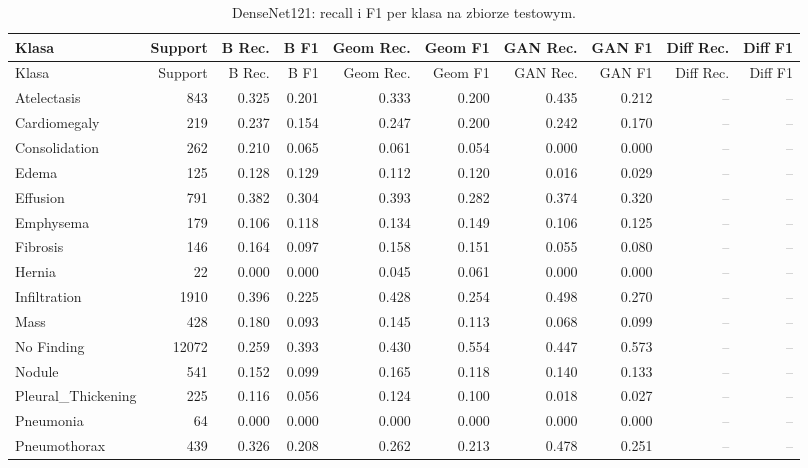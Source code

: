 \documentclass[11pt,a4paper]{article}
\newcommand{\missingresult}{\textcolor{gray}{--}}
\begin{document}
\scriptsize
\begin{longtable}{lrrrrrrrrr}
\caption{DenseNet121: recall i F1 per klasa na zbiorze testowym.}
\label{tab:densenet-per-class}\\
\toprule
Klasa & Support & B Rec. & B F1 & Geom Rec. & Geom F1 & GAN Rec. & GAN F1 & Diff Rec. & Diff F1 \\
\midrule
\endfirsthead
\toprule
Klasa & Support & B Rec. & B F1 & Geom Rec. & Geom F1 & GAN Rec. & GAN F1 & Diff Rec. & Diff F1 \\
\midrule
\endhead
Atelectasis & 843 & 0.325 & 0.201 & 0.333 & 0.200 & 0.435 & 0.212 & \missingresult & \missingresult \\
Cardiomegaly & 219 & 0.237 & 0.154 & 0.247 & 0.200 & 0.242 & 0.170 & \missingresult & \missingresult \\
Consolidation & 262 & 0.210 & 0.065 & 0.061 & 0.054 & 0.000 & 0.000 & \missingresult & \missingresult \\
Edema & 125 & 0.128 & 0.129 & 0.112 & 0.120 & 0.016 & 0.029 & \missingresult & \missingresult \\
Effusion & 791 & 0.382 & 0.304 & 0.393 & 0.282 & 0.374 & 0.320 & \missingresult & \missingresult \\
Emphysema & 179 & 0.106 & 0.118 & 0.134 & 0.149 & 0.106 & 0.125 & \missingresult & \missingresult \\
Fibrosis & 146 & 0.164 & 0.097 & 0.158 & 0.151 & 0.055 & 0.080 & \missingresult & \missingresult \\
Hernia & 22 & 0.000 & 0.000 & 0.045 & 0.061 & 0.000 & 0.000 & \missingresult & \missingresult \\
Infiltration & 1910 & 0.396 & 0.225 & 0.428 & 0.254 & 0.498 & 0.270 & \missingresult & \missingresult \\
Mass & 428 & 0.180 & 0.093 & 0.145 & 0.113 & 0.068 & 0.099 & \missingresult & \missingresult \\
No Finding & 12072 & 0.259 & 0.393 & 0.430 & 0.554 & 0.447 & 0.573 & \missingresult & \missingresult \\
Nodule & 541 & 0.152 & 0.099 & 0.165 & 0.118 & 0.140 & 0.133 & \missingresult & \missingresult \\
Pleural\_Thickening & 225 & 0.116 & 0.056 & 0.124 & 0.100 & 0.018 & 0.027 & \missingresult & \missingresult \\
Pneumonia & 64 & 0.000 & 0.000 & 0.000 & 0.000 & 0.000 & 0.000 & \missingresult & \missingresult \\
Pneumothorax & 439 & 0.326 & 0.208 & 0.262 & 0.213 & 0.478 & 0.251 & \missingresult & \missingresult \\
\bottomrule
\end{longtable}
\normalsize
\end{document}
